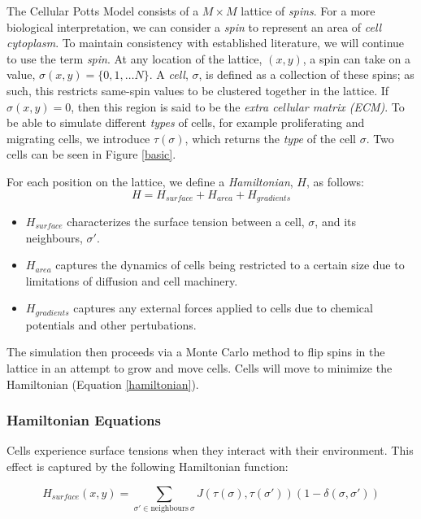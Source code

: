 \documentclass[12pt]{article}
\begin{document}
The Cellular Potts Model consists of a $M\times M$ lattice of \emph{spins}. For a more biological interpretation, we can consider a \emph{spin} to represent an area of \emph{cell cytoplasm}. To maintain consistency with established literature, we will continue to use the term \emph{spin}. At any location of the lattice, $(x,y)$, a spin can take on a value, $\sigma(x,y) = \{0,1,\ldots N\}$. A \emph{cell}, $\sigma$, is defined as a collection of these spins; as such, this restricts same-spin values to be clustered together in the lattice. If $\sigma(x,y) = 0$, then this region is said to be the \emph{extra cellular matrix (ECM)}. To be able to simulate different \emph{types} of cells, for example proliferating and migrating cells, we introduce $\tau(\sigma)$, which returns the \emph{type} of the cell $\sigma$. Two cells can be seen in Figure \ref{basic}.

For each position on the lattice, we define a \emph{Hamiltonian}, $H$, as follows:
\begin{equation}
	H = H_{surface} + H_{area} + H_{gradients}
	\label{hamiltonian}
\end{equation}

\begin{itemize}
	\item $H_{surface}$ characterizes the surface tension between a cell, $\sigma$, and its neighbours, $\sigma'$.
	\item $H_{area}$ captures the dynamics of cells being restricted to a certain size due to limitations of diffusion and cell machinery. 
	\item $H_{gradients}$ captures any external forces applied to cells due to chemical potentials and other pertubations.
\end{itemize}

The simulation then proceeds via a Monte Carlo method to flip spins in the lattice in an attempt to grow and move cells. Cells will move to minimize the Hamiltonian (Equation \ref{hamiltonian}).

\subsubsection{Hamiltonian Equations}
Cells experience surface tensions when they interact with their environment. This effect is captured by the following Hamiltonian function:

\begin{equation}
	H_{surface} (x,y) = \sum_{\sigma' \in \text{neighbours}~\sigma} J(\tau(\sigma), \tau(\sigma'))(1-\delta(\sigma, \sigma'))
\end{equation}
\end{document}

